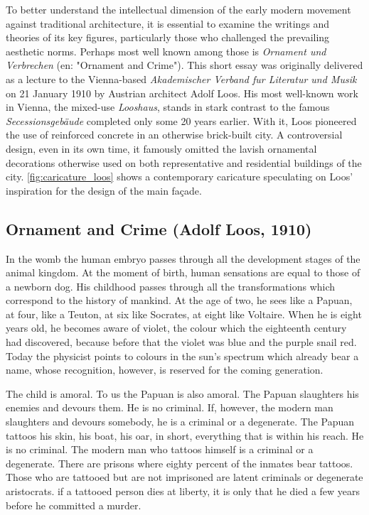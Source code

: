 \documentclass[a4paper]{article}
\begin{document}
\begin{mdframed}[linewidth=1pt, roundcorner=5pt, innerleftmargin=10pt, innerrightmargin=10pt, innertopmargin=10pt, innerbottommargin=10pt, linecolor=black, backgroundcolor=white, userdefinedwidth=\textwidth]
    To better understand the intellectual dimension of the early modern movement against traditional architecture, it is essential to examine the writings and theories of its key figures, particularly those who challenged the prevailing aesthetic norms. Perhaps most well known among those is \textit{Ornament und Verbrechen} \cite{loos_ornament_1908} (en: "Ornament and Crime"). This short essay was originally delivered as a lecture to the Vienna-based \textit{Akademischer Verband fur Literatur und Musik} on 21 January 1910 by Austrian architect Adolf Loos. His most well-known work in Vienna, the mixed-use \textit{Looshaus}, stands in stark contrast to the famous \textit{Secessionsgebäude} completed only some 20 years earlier. With it, Loos pioneered the use of reinforced concrete in an otherwise brick-built city. A controversial design, even in its own time, it famously omitted the lavish ornamental decorations otherwise used on both representative and residential buildings of the city. \cref{fig:caricature_loos} shows a contemporary caricature speculating on Loos' inspiration for the design of the main façade.
    \label{fig:caricature_loos}
\end{mdframed}

\subsection{Ornament and Crime (Adolf Loos, 1910)}

In the womb the human embryo passes through all the development stages of the animal kingdom. At the moment of birth, human sensations are equal to those of a newborn dog. His childhood passes through all the transformations which correspond to the history of mankind. At the age of two, he sees like a Papuan, at four, like a Teuton, at six like Socrates, at eight like Voltaire. When he is eight years old, he becomes aware of violet, the colour which the eighteenth century had discovered, because before that the violet was blue and the purple snail red. Today the physicist points to colours in the sun’s spectrum which already bear a name, whose recognition, however, is reserved for the coming generation.

The child is amoral. To us the Papuan is also amoral. The Papuan slaughters his enemies and devours them. He is no criminal. If, however, the modern man slaughters and devours somebody, he is a criminal or a degenerate. The Papuan tattoos his skin, his boat, his oar, in short, everything that is within his reach. He is no criminal. The modern man who tattoos himself is a criminal or a degenerate. There are prisons where eighty percent of the inmates bear tattoos. Those who are tattooed but are not imprisoned are latent criminals or degenerate aristocrats. if a tattooed person dies at liberty, it is only that he died a few years before he committed a murder.
\end{document}
